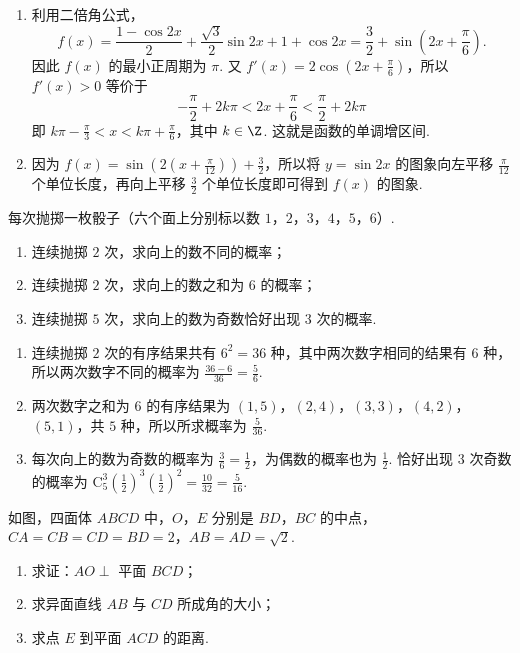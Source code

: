 \begin{solution}
\begin{enumerate}
\item 利用二倍角公式，\[
f(x)=\frac{1-\cos2x}{2}+\frac{\sqrt{3}}{2}\sin2x+1+\cos2x
=\frac{3}{2}+\sin\left(2x+\frac{\pi}{6}\right).
\]
因此 \(f(x)\) 的最小正周期为 \(\pi\). 又
\(f'(x)=2\cos\left(2x+\frac{\pi}{6}\right)\)，所以 \(f'(x)>0\) 等价于
\[
-\frac{\pi}{2}+2k\pi<2x+\frac{\pi}{6}<\frac{\pi}{2}+2k\pi
\]
即 \(k\pi-\frac{\pi}{3}<x<k\pi+\frac{\pi}{6}\)，其中 \(k\in\Z\). 这就是函数的单调增区间.
\item 因为
\(f(x)=\sin\left(2\left(x+\frac{\pi}{12}\right)\right)+\frac{3}{2}\)，所以将 \(y=\sin2x\) 的图象向左平移 \(\frac{\pi}{12}\) 个单位长度，再向上平移 \(\frac{3}{2}\) 个单位长度即可得到 \(f(x)\) 的图象.
\end{enumerate}
\end{solution}

\begin{problem}
每次抛掷一枚骰子（六个面上分别标以数 \(1\)，\(2\)，\(3\)，\(4\)，\(5\)，\(6\)）.

\begin{enumerate}
\item 连续抛掷 \(2\) 次，求向上的数不同的概率；
\item 连续抛掷 \(2\) 次，求向上的数之和为 \(6\) 的概率；
\item 连续抛掷 \(5\) 次，求向上的数为奇数恰好出现 \(3\) 次的概率.
\end{enumerate}
\end{problem}

\begin{solution}
\begin{enumerate}
\item 连续抛掷 \(2\) 次的有序结果共有 \(6^2=36\) 种，其中两次数字相同的结果有 \(6\) 种，所以两次数字不同的概率为
\(\frac{36-6}{36}=\frac{5}{6}\).
\item 两次数字之和为 \(6\) 的有序结果为 \((1,5)\)，\((2,4)\)，\((3,3)\)，\((4,2)\)，\((5,1)\)，共 \(5\) 种，所以所求概率为 \(\frac{5}{36}\).
\item 每次向上的数为奇数的概率为 \(\frac{3}{6}=\frac{1}{2}\)，为偶数的概率也为 \(\frac{1}{2}\). 恰好出现 \(3\) 次奇数的概率为
\(\mathrm C_5^3\left(\frac{1}{2}\right)^3\left(\frac{1}{2}\right)^2=\frac{10}{32}=\frac{5}{16}\).
\end{enumerate}
\end{solution}

\begin{problem}
如图，四面体 \(ABCD\) 中，\(O\)，\(E\) 分别是 \(BD\)，\(BC\) 的中点，\(CA = CB = CD = BD = 2\)，\(AB = AD = \sqrt{2}\).
\begin{enumerate}
\item 求证：\(AO \perp\) 平面 \(BCD\)；
\item 求异面直线 \(AB\) 与 \(CD\) 所成角的大小；
\item 求点 \(E\) 到平面 \(ACD\) 的距离.
\end{enumerate}

\end{problem}

